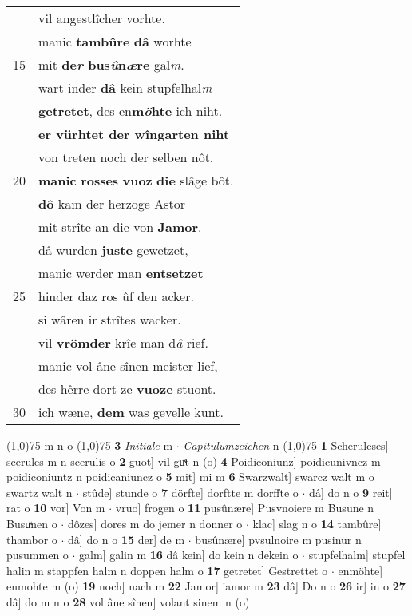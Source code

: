 \documentclass[8pt,a4paper,notitlepage]{article}
\begin{document}
\begin{table}[ht]
\begin{minipage}[t]{0.5\linewidth}
\begin{tabular}{rl}
 & vil angestlîcher vorhte.\\ 
 & manic \textbf{tambûre} \textbf{dâ} worhte\\ 
15 & mit \textbf{de\textit{r} bus\textit{û}n\textit{æ}re} gal\textit{m}.\\ 
 & wart inder \textbf{dâ} kein stupfelhal\textit{m}\\ 
 & \textbf{getretet}, des en\textbf{m\textit{ö}hte} ich niht.\\ 
 & \textbf{er vürhtet der wîngarten niht}\\ 
 & von treten noch der selben nôt.\\ 
20 & \textbf{manic} \textbf{rosses} \textbf{vuoz} \textbf{die} slâge bôt.\\ 
 & \textbf{dô} kam der herzoge Astor\\ 
 & mit strîte an die von \textbf{Jamor}.\\ 
 & dâ wurden \textbf{juste} gewetzet,\\ 
 & manic werder man \textbf{entsetzet}\\ 
25 & hinder daz ros ûf den acker.\\ 
 & si wâren ir strîtes wacker.\\ 
 & vil \textbf{vrömder} krîe man d\textit{â} rief.\\ 
 & manic vol âne sînen meister lief,\\ 
 & des hêrre dort ze \textbf{vuoze} stuont.\\ 
30 & ich wæne, \textbf{dem} was gevelle kunt.\\ 
\end{tabular}
\scriptsize
\line(1,0){75} \newline
m n o \newline
\line(1,0){75} \newline
\textbf{3} \textit{Initiale} m   $\cdot$ \textit{Capitulumzeichen} n  \newline
\line(1,0){75} \newline
\textbf{1} Scheruleses] scerules m n scerulis o \textbf{2} guot] vil guͯt n (o) \textbf{4} Poidiconiunz] poidicunivncz m poidiconiuntz n poidicaniuncz o \textbf{5} mit] mi m \textbf{6} Swarzwalt] swarcz walt m o swartz walt n  $\cdot$ stûde] stunde o \textbf{7} dörfte] dorftte m dorffte o  $\cdot$ dâ] do n o \textbf{9} reit] rat o \textbf{10} vor] Von m  $\cdot$ vruo] frogen o \textbf{11} pusûnære] Pusvnoiere m Busune n Busuͯnen o  $\cdot$ dôzes] dores m do jemer n donner o  $\cdot$ klac] slag n o \textbf{14} tambûre] thambor o  $\cdot$ dâ] do n o \textbf{15} der] de m  $\cdot$ busûnære] pvsulnoire m pusinur n pusummen o  $\cdot$ galm] galin m \textbf{16} dâ kein] do kein n dekein o  $\cdot$ stupfelhalm] stupfel halin m stappfen halm n doppen halm o \textbf{17} getretet] Gestrettet o  $\cdot$ enmöhte] enmohte m (o) \textbf{19} noch] nach m \textbf{22} Jamor] iamor m \textbf{23} dâ] Do n o \textbf{26} ir] in o \textbf{27} dâ] do m n o \textbf{28} vol âne sînen] volant sinem n (o) \newline
\end{minipage}
\end{table}
\end{document}
